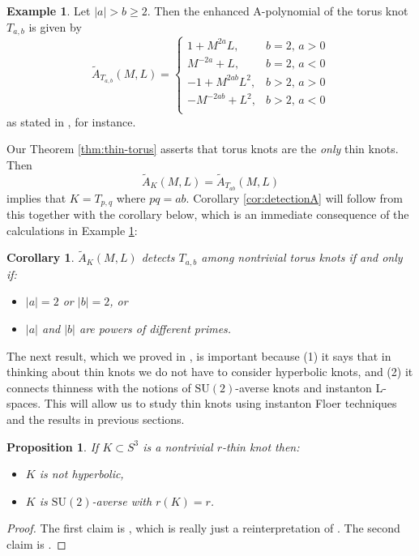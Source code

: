 \documentclass[11pt]{amsart}
\newtheorem {proposition}[theorem]{Proposition}
\newtheorem {corollary}[theorem]{Corollary}
\numberwithin{equation}{section}
\numberwithin{theorem}{section}
\theoremstyle{definition}
\newtheorem{example}[theorem]{Example}
\newcommand\SU{\mathrm{SU}}
\begin{document}
\begin{example}\label{ex:torus}
Let $|a| > b \geq 2$. Then the enhanced A-polynomial of the torus knot $T_{a,b}$
is given by \[\tilde{A}_{T_{a,b}}(M,L) = \begin{cases}
1+M^{2a}L, &  b=2, \,a>0\\ 
M^{-2a}+L,&  b=2, \,a<0\\
-1+M^{2ab}L^2, &b>2, \,a>0\\ 
-M^{-2ab}+L^2, & b>2, \,a<0\\ 
\end{cases}\]
as stated in \cite[Lemma 2.1]{ni-zhang}, for instance. 
\end{example}

Our Theorem \ref{thm:thin-torus} asserts that  torus knots are the \emph{only} thin knots. Then \[\tilde{A}_K(M,L) = \tilde{A}_{T_{ab}}(M,L) \] implies that  $K = T_{p,q}$ where $pq=ab$. Corollary \ref{cor:detectionA} will follow from this together with the corollary below, which is an immediate consequence of the calculations in Example \ref{ex:torus}:

\begin{corollary}
\label{cor:detectionB}
$\tilde{A}_K(M,L)$ detects  $T_{a,b}$ among nontrivial torus knots if and only if:
\begin{itemize}
\item $|a|=2$ or $|b|=2$, or 
\item $|a|$ and $|b|$ are powers of different primes.
\end{itemize} 
\end{corollary}

The next result, which we proved in \cite[\S10]{bs-lspace}, is important because (1) it says that in thinking about thin knots we do not have to consider hyperbolic knots, and (2) it connects thinness with the notions of $\SU(2)$-averse knots and instanton L-spaces. This will allow us to study thin knots using instanton Floer techniques and the results in previous sections.

\begin{proposition} \label{prop:thin-basics}
If $K\subset S^3$ is a nontrivial $r$-thin knot then:
\begin{itemize}
\item $K$ is not hyperbolic, 
\item  $K$ is $\SU(2)$-averse with $r(K) = r$.
\end{itemize}
\end{proposition}

\begin{proof}
The first claim is \cite[Proposition~10.7]{bs-lspace}, which is really just a reinterpretation of \cite[Proposition~2.6]{ccgls}.  The second claim is  \cite[Proposition~10.10]{bs-lspace}.\end{proof}
\end{document}
